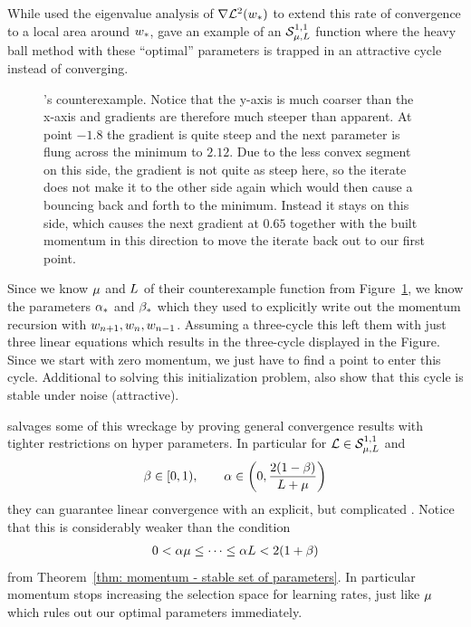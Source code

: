 While
\textcite[pp. 65-67]{polyakIntroductionOptimization1987} used the eigenvalue
analysis of \(\nabla\mathcal{L}^2(w_*)\) to extend this rate of convergence
to a local area around \(w_*\), \textcite[pp. 78-79]{lessardAnalysisDesignOptimization2016}
gave an example of an \(\mathcal{S}^{1,1}_{{\mu},{L}}\) function where
the heavy ball method with these ``optimal'' parameters is trapped in an attractive
cycle instead of converging. 
%
\begin{figure}[h]
	\centering
	\def\svgwidth{1\textwidth}
	
	\caption{
		\citeauthor{lessardAnalysisDesignOptimization2016}'s counterexample.
		Notice that the y-axis is much coarser than the x-axis and gradients are
		therefore much steeper than apparent. At point \(-1.8\) the gradient is
		quite steep and the next parameter is flung across the minimum to
		\(2.12\). Due to the less convex segment on this side, the gradient is
		not quite as steep here, so the iterate does not make it to the other
		side again which would then cause a bouncing back and forth to the
		minimum. Instead it stays on this side, which causes the next gradient
		at \(0.65\) together with the built momentum in this direction to move the
		iterate back out to our first point.
	}
	\label{fig: heavy ball counterexample}
\end{figure}

Since we know \(\mu\) and \(L\) of their counterexample function from
Figure~\ref{fig: heavy ball counterexample}, we know the parameters \(\alpha_*\)
and \(\beta_*\) which they used to explicitly write out the momentum recursion
with \(w_{n+1}, w_{n}, w_{n-1}\). Assuming a three-cycle
this left them with just three linear equations which results in the three-cycle
displayed in the Figure. Since we start with zero momentum, we just have to
find a point to enter this cycle. Additional to solving this initialization
problem, \textcite[pp. 93-94]{lessardAnalysisDesignOptimization2016} also show
that this cycle is stable under noise (attractive).

\textcite{ghadimiGlobalConvergenceHeavyball2015} salvages some of this wreckage
by proving general convergence results with tighter restrictions on hyper
parameters. In particular for \(\mathcal{L}\in\mathcal{S}^{1,1}_{{\mu},{L}}\) and
\begin{align*}
	\beta\in[0,1),
	\qquad \alpha\in \left(0, \frac{2(1-\beta)}{L+\mu}\right)
\end{align*}
they can guarantee linear convergence with an explicit, but complicated
. Notice that this is
considerably weaker than the condition
\begin{align*}
	0<\alpha\mu \le \dots \le \alpha L < 2(1+\beta)
\end{align*}
from Theorem~\ref{thm: momentum - stable set of parameters}. In particular
momentum stops increasing the selection space for learning rates, just like
\(\mu\) which rules out our optimal parameters immediately. 

